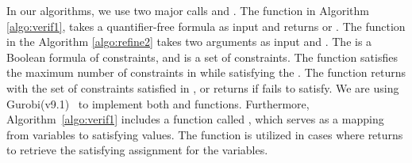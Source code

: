 
In our algorithms, we use two major calls \checksat{} and \maxsat{}.
The function \checksat{} in Algorithm \ref{algo:verif1}, 
takes a quantifier-free formula as input and returns \sat{} or \unsat{}. 
The function \maxsat{} in the Algorithm \ref{algo:refine2} takes
two arguments as input \hardconstr{} and \softconstr{}. 
The \hardconstr{} is a Boolean formula of constraints,
and \softconstr{} is a set of constraints. 
The function \maxsat{} satisfies the maximum number of constraints
in \softconstr{} while satisfying the \hardconstr{}. 
The function \maxsat{} returns \sat{} with the set of
constraints satisfied in \softconstr{}, or returns
\unsat{} if \hardconstr{} fails to satisfy.
We are using Gurobi(v9.1)~\cite{gurobioptimizer} to implement 
both \checksat{} and \maxsat{} functions. 
Furthermore, Algorithm~\ref{algo:verif1} includes a function called \getmodel{}, 
which serves as a mapping from variables to satisfying values. 
The \getmodel{} function is utilized in cases where \checksat{} returns \sat{} to retrieve 
the satisfying assignment for the variables.
 






